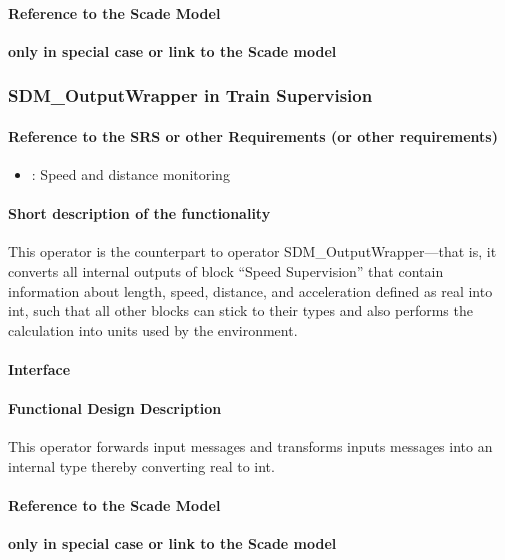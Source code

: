\paragraph{Reference to the Scade Model}
\textbf{only in special case or link to the Scade model}

\subsubsection{SDM\_OutputWrapper in Train Supervision}
\paragraph{Reference to the SRS or other Requirements (or other requirements)}
\begin{itemize}
	\item \cite[Chapt.~3.13]{subset-026}: Speed and distance monitoring 
\end{itemize}

\paragraph{Short description of the functionality}
This operator is the counterpart to operator SDM\_OutputWrapper---that is, it converts all internal outputs of block ``Speed Supervision'' that contain information about length, speed, distance, and acceleration defined as real into int, such that all other blocks can stick to their types and also performs the calculation into units used by the environment.

\paragraph{Interface}

\paragraph{Functional Design Description}
This operator forwards input messages and transforms inputs messages into an internal type thereby converting real to int.
  
\paragraph{Reference to the Scade Model}
\textbf{only in special case or link to the Scade model}